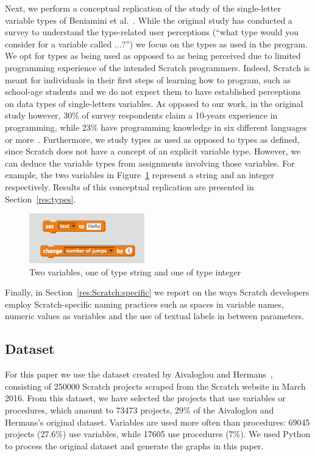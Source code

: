 \documentclass[conference]{IEEEtran}
\begin{document}
Next, we perform a conceptual replication of the study of the single-letter variable types of Beniamini et al.~\cite{Beniamini}. 
While the original study has conducted a survey to understand the type-related user perceptions (``what type would you consider for a variable called ...?'') we focus on the types as used in the program. 
We opt for types as being used as opposed to as being perceived due to limited programming experience of the intended Scratch programmers.
Indeed, Scratch is meant for individuals in their first steps of learning how to program, such as school-age students and we do not expect them to have established  perceptions on data types of single-letters variables. 
As opposed to our work, in the original study however, 30\% of survey respondents claim a 10-years experience in programming, while  23\% have programming knowledge in six different languages or more~\cite{Beniamini}. 
Furthermore, we study types as used as opposed to types as defined, since Scratch does not have a concept of an explicit variable type.
However, we can deduce the variable types from assignments involving those variables. 
For example, the two variables in Figure~\ref{fig:types} represent a string and an integer respectively. 
Results of this conceptual replication are presented in Section~\ref{res:types}.

\begin{figure}
	\begin{center}
		\includegraphics[width=5cm]{fig/types}
		\caption{Two variables, one of type string and one of type integer}
		\label{fig:types}
	\end{center}
\end{figure} 

Finally, in Section~\ref{res:Scratch:specific} we report on the ways Scratch developers employ Scratch-specific naming practices such as spaces in variable names, numeric values as variables and the use of textual labels in between parameters.

\subsection{Dataset}
For this paper we use the dataset created by Aivaloglou and Hermans~\cite{Aivaloglou2016HowKC}, consisting of 250000 Scratch projects scraped from the Scratch website in March 2016. 
From this dataset, we have selected the projects that use variables or procedures, which amount to 73473 projects, 29\% of the Aivaloglou and Hermans's original dataset. 
Variables are used more often than procedures: 69045 projects (27.6\%) use variables, while 17605 use procedures (7\%). 
We used Python to process the original dataset and generate the graphs in this paper.
\end{document}
